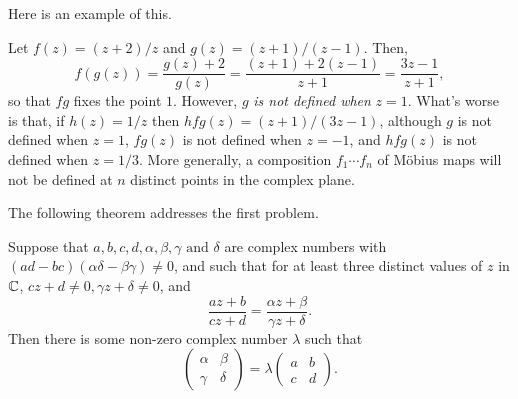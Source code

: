\documentclass[main.tex]{subfiles}
\begin{document}
		Here is an example of this.
		\begin{example}
			Let $f(z) = (z + 2)/ z$ and $g(z) = (z + 1)/(z - 1)$. Then,
			\begin{equation*}
				f(g(z)) = \frac{g(z) + 2}{g(z)} = \frac{(z + 1)+ 2(z-1)}{z+ 1} = \frac{3z - 1}{z + 1},
			\end{equation*}
			so that $fg$ fixes the point $1$. However, $g$ \textit{is not defined when} $z = 1$. What's worse is that, if $h(z) = 1/z$ then $hfg(z) = (z+1)/(3z - 1)$, although $g$ is not defined when $z = 1$, $fg(z)$ is not defined when $z = -1$, and $hfg(z)$ is not defined when $z = 1/3$. More generally, a composition $f_1 \cdots f_n$ of M\"obius maps will not be defined at $n$ distinct points in the complex plane.
		\end{example}
		The following theorem addresses the first problem.
		\begin{theorem}
			Suppose that $a, b, c, d, \alpha, \beta, \gamma \text{ and } \delta$ are complex numbers with ${(ad - bc)}{(\alpha\delta - \beta\gamma)}{\neq 0}$, and such that for at least three distinct values of $z$ in $\mathbb C$, $cz + d \neq 0, \gamma z+ \delta \neq 0$, and
			\begin{equation*}
				\frac{az + b}{cz + d} = \frac{\alpha z + \beta}{\gamma z + \delta}.
			\end{equation*}
			Then there is some non-zero complex number $\lambda$ such that
			\begin{equation}
				\begin{pmatrix}
					\alpha & \beta \\
					\gamma & \delta
				\end{pmatrix}
				= \lambda\begin{pmatrix}
					a & b \\
					c & d
				\end{pmatrix}.
			\end{equation}
		\end{theorem}
\end{document}
